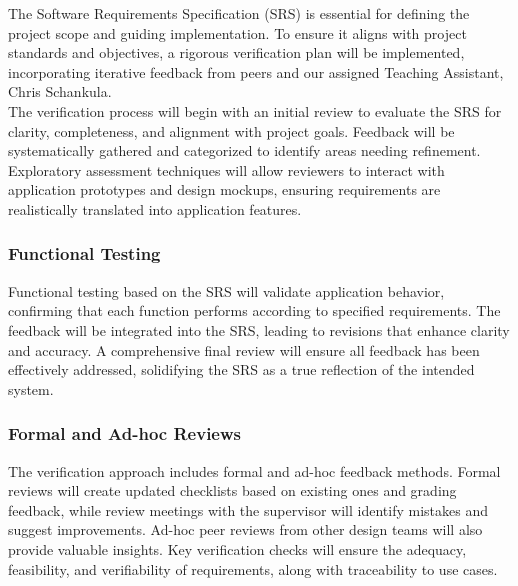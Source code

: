 \documentclass[12pt, titlepage]{article}
\begin{document}
The Software Requirements Specification (SRS) is essential for defining the
project scope and guiding implementation. To ensure it aligns with project
standards and objectives, a rigorous verification plan will be implemented,
incorporating iterative feedback from peers and our assigned Teaching Assistant,
Chris Schankula.\\
\newline
The verification process will begin with an initial review to evaluate the SRS
for clarity, completeness, and alignment with project goals. Feedback will be
systematically gathered and categorized to identify areas needing refinement.
Exploratory assessment techniques will allow reviewers to interact with
application prototypes and design mockups, ensuring requirements are
realistically translated into application features.

\subsubsection{Functional Testing}
Functional testing based on the SRS will validate application behavior,
confirming that each function performs according to specified requirements. The
feedback will be integrated into the SRS, leading to revisions that enhance
clarity and accuracy. A comprehensive final review will ensure all feedback has
been effectively addressed, solidifying the SRS as a true reflection of the
intended system.

\subsubsection{Formal and Ad-hoc Reviews}
The verification approach includes formal and ad-hoc feedback methods. Formal
reviews will create updated checklists based on existing ones and grading
feedback, while review meetings with the supervisor will identify mistakes and
suggest improvements. Ad-hoc peer reviews from other design teams will also
provide valuable insights. Key verification checks will ensure the adequacy,
feasibility, and verifiability of requirements, along with traceability to use
cases.
\end{document}
